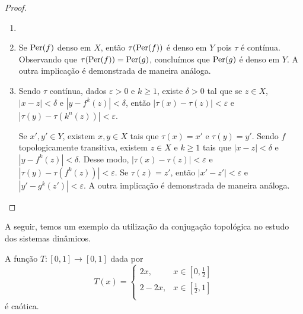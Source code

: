 \begin{proof}
\begin{enumerate}\item[]
\item Se $\operatorname{Per}(f)$ denso em $X$, então $\tau(\operatorname{Per}(f))$ é denso em $Y$ pois $\tau$ é contínua. Observando que $\tau(\operatorname{Per}(f)) = \operatorname{Per}(g)$, concluímos que $\operatorname{Per}(g)$ é denso em $Y$. A outra implicação é demonstrada de maneira análoga.
\item Sendo $\tau$ contínua, dados $\varepsilon > 0$ e $k \geq 1$, existe $\delta > 0$ tal que se $z \in X$, $|x - z| < \delta$ e $|y - f^k(z)| < \delta$, então $|\tau(x) - \tau(z)| < \varepsilon$ e $|\tau(y) - \tau(k^n(z))| < \varepsilon$.

Se $x', y' \in Y$, existem $x, y \in X$ tais que $\tau(x) = x'$ e $\tau(y) =  y'$. Sendo $f$ topologicamente transitiva, existem $z \in X$ e $k \geq 1$ tais que $|x - z| < \delta$ e $|y - f^k(z)| < \delta$. Desse modo, $|\tau(x) - \tau(z)| < \varepsilon$ e $|\tau(y) - \tau(f^k(z))| < \varepsilon$. Se $\tau(z) = z'$, então $|x' - z'| < \varepsilon$ e $|y' - g^k(z')| < \varepsilon$. A outra implicação é demonstrada de maneira análoga.
\end{enumerate}
\end{proof}

A seguir, temos um exemplo da utilização da conjugação topológica no estudo dos sistemas dinâmicos.

\begin{lemma}
A função $T: [0,1] \to [0,1]$ dada por
\[ T(x) =
  \begin{cases}
    2x, & x \in \left[ 0, \frac{1}{2} \right] \\
    2 - 2x, & x \in \left[ \frac{1}{2}, 1 \right] \\
  \end{cases}
\]
é caótica.
\end{lemma}

